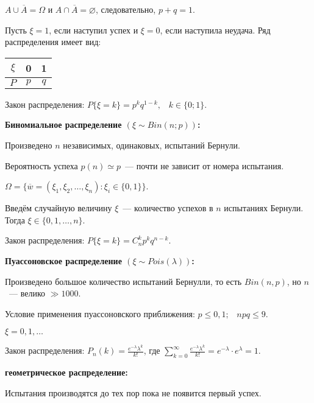     $A \cup \overline{A} = \Omega$ и $A \cap \overline{A} = \varnothing$, 
    следовательно, $p + q = 1$.
    \smallskip

    Пусть $\xi = 1$, если наступил успех и $\xi = 0$, если наступила неудача.
    Ряд распределения имеет вид:

    \begin{center}
        \begin{tabular}{|c|c|c|}
            \hline
            $\xi$ & 0 & 1 \\
            \hline
            $P$ & $p$ & $q$ \\
            \hline
        \end{tabular}
    \end{center}
    \smallskip

    Закон распределения: $P\{\xi = k\} = p^{k} q^{1 - k}, \;\;\; k \in \{0; 1\}$.
    \bigskip

\textbf{Биномиальное распределение $(\xi \sim Bin(n; p))$:}
    \smallskip
    
    Произведено $n$ независимых, одинаковых, испытаний Бернули.

    Вероятность успеха $p(n) \simeq p$~--- почти не зависит от номера
    испытания.

    $\Omega = \{\overline{w} = (\xi_1, \xi_2, \dots, \xi_n) :
    \xi_i \in \{0, 1\} \}$.
    \smallskip

    Введём случайную величину $\xi$~--- количество успехов в $n$ испытаниях
    Бернули. Тогда $\xi \in \{0, 1, \dots, n\}$.
    \smallskip

    Закон распределения: $P\{\xi = k\} = C^{k}_{n} p^{k} q^{n - k}$.
    \bigskip

\textbf{Пуассоновское распределение $(\xi \sim Pois(\lambda))$:}
    \smallskip
    
    Произведено большое количество испытаний Бернулли, то есть $Bin(n, p)$,
    но $n$~--- велико $\gg 1000$.

    Условие применения пуассоновского приближения: $p \leq 0,1; \;\;\; npq \leq 9$.
    \smallskip

    $\xi = 0, 1, \dots$
    \smallskip

    Закон распределения: $P_n(k) = \frac{e^{-\lambda} \lambda^{k}}{k!}$,
    где $\sum^{\infty}_{k = 0} \frac{e^{-\lambda} \lambda^k}{k!} = e^{-\lambda} 
    \cdot e^{\lambda} = 1$.
    \bigskip

\textbf{геометрическое распределение:}
    \smallskip

    Испытания производятся до тех пор пока не появится первый успех.
    \smallskip

